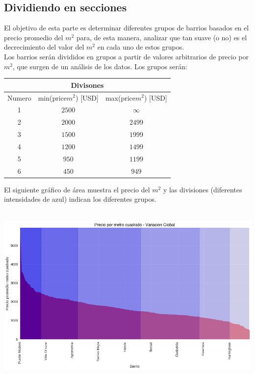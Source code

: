 \documentclass[a4paper, 10pt]{article}
\newcommand\tab[1][0.5cm]{\hspace*{#1}}
\begin{document}
			\subsection{Dividiendo en secciones}
				El objetivo de esta parte es determinar diferentes grupos de barrios basados en el precio promedio del $m^2$
				para, de esta manera, analizar que tan suave (o no) es el decrecimiento del valor del $m^2$ en cada uno de
				estos grupos. \\
				\tab Los barrios serán divididos en grupos a partir de valores arbitrarios de precio por $m^2$, que surgen de
				un análisis de los datos. Los grupos serán:
				\begin{center}
					\begin{tabular}{ |c|c|c| }
						\hline
						\multicolumn{3}{|c|}{Divisones} \\
						\hline
						\hline
						Numero & min(price$m^2$) [USD] & max(price$m^2$) [USD] \\
						\hline
						1 & $2500$ & $\infty$ \\
						\hline
						2 & $2000$ & $2499$ \\
						\hline
						3 & $1500$ & $1999$ \\	
						\hline
						4 & $1200$ & $1499$ \\
						\hline
						5 & $950$ & $1199$ \\		
						\hline
						6 & $450$ & $949$ \\			
						\hline
					\end{tabular}
				\end{center}
				\tab El siguiente gráfico de área muestra el precio del $m^2$ y las divisiones (diferentes intensidades de
				azul) indican los diferentes grupos.
				\begin{center}
   	    				\includegraphics[width=6in, height=3.6in]{images/m2HoodsDivision}
			  	\end{center}
\end{document}
